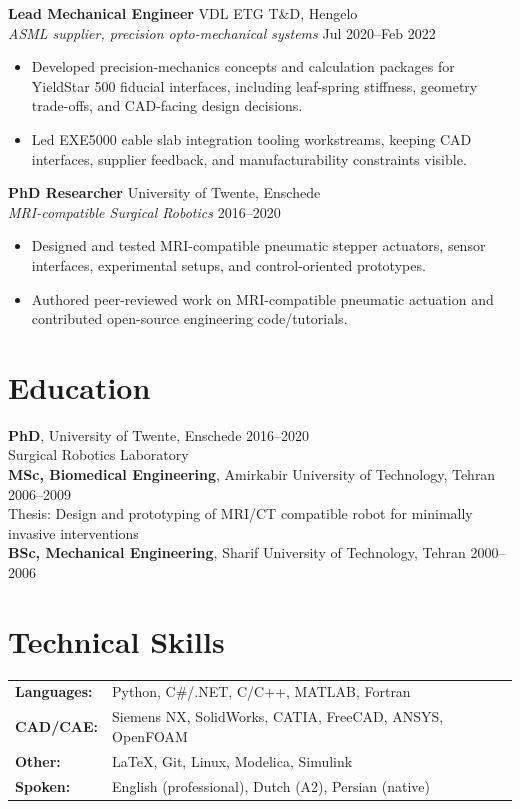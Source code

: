 \documentclass[10pt,a4paper]{article}
\begin{document}
\vspace{4pt}
\textbf{Lead Mechanical Engineer} \hfill VDL ETG T\&D, Hengelo \\
{\small\textit{ASML supplier, precision opto-mechanical systems}} \hfill {\small Jul 2020--Feb 2022}
\begin{itemize}
 \item Developed precision-mechanics concepts and calculation packages for YieldStar 500 fiducial interfaces, including leaf-spring stiffness, geometry trade-offs, and CAD-facing design decisions.
 \item Led EXE5000 cable slab integration tooling workstreams, keeping CAD interfaces, supplier feedback, and manufacturability constraints visible.
\end{itemize}

\vspace{4pt}
\textbf{PhD Researcher} \hfill University of Twente, Enschede \\
{\small\textit{MRI-compatible Surgical Robotics}} \hfill {\small 2016--2020}
\begin{itemize}
 \item Designed and tested MRI-compatible pneumatic stepper actuators, sensor interfaces, experimental setups, and control-oriented prototypes.
 \item Authored peer-reviewed work on MRI-compatible pneumatic actuation and contributed open-source engineering code/tutorials.
\end{itemize}

\section{Education}

\textbf{PhD}, University of Twente, Enschede \hfill 2016--2020 \\
{\small Surgical Robotics Laboratory } \\[2pt]
\textbf{MSc, Biomedical Engineering}, Amirkabir University of Technology, Tehran \hfill 2006--2009 \\
{\small Thesis: Design and prototyping of MRI/CT compatible robot for minimally invasive interventions} \\[2pt]
\textbf{BSc, Mechanical Engineering}, Sharif University of Technology, Tehran \hfill 2000--2006

\section{Technical Skills}

{\small
\begin{tabularx}{\textwidth}{@{}lX@{}}
 \textbf{Languages:} & Python, C\#/.NET, C/C++, MATLAB, Fortran \\
 \textbf{CAD/CAE:}   & Siemens NX, SolidWorks, CATIA, FreeCAD, ANSYS, OpenFOAM \\
 \textbf{Other:}    & \LaTeX, Git, Linux, Modelica, Simulink \\
 \textbf{Spoken:}   & English (professional), Dutch (A2), Persian (native) \\
\end{tabularx}
}
\end{document}
